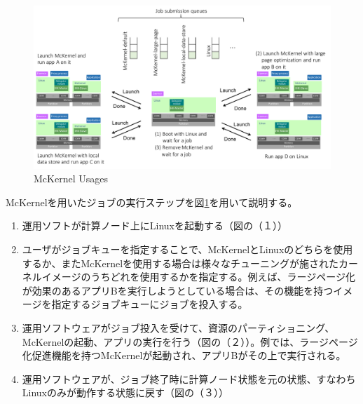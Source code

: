 \documentclass[twoside,11pt,fleqn]{book}
\begin{document}
\begin{figure}[hbt]
\begin{center}
\includegraphics[width=0.9\linewidth]{figs/McKernelUsage.pdf}
\end{center}
\caption{McKernel Usages}\label{fig:mckernel-usage}
\end{figure}
%
McKernelを用いたジョブの実行ステップを図\ref{fig:mckernel-usage}を用いて説明する。
\begin{enumerate}
\item 運用ソフトが計算ノード上にLinuxを起動する（図の（１））
\item ユーザがジョブキューを指定することで、McKernelとLinuxのどちらを使用するか、またMcKernelを使用する場合は様々なチューニングが施されたカーネルイメージのうちどれを使用するかを指定する。例えば、ラージページ化が効果のあるアプリBを実行しようとしている場合は、その機能を持つイメージを指定するジョブキューにジョブを投入する。
\item 運用ソフトウェアがジョブ投入を受けて、資源のパーティショニング、McKernelの起動、アプリの実行を行う（図の（２））。例では、ラージページ化促進機能を持つMcKernelが起動され、アプリBがその上で実行される。
\item 運用ソフトウェアが、ジョブ終了時に計算ノード状態を元の状態、すなわちLinuxのみが動作する状態に戻す（図の（３））
\end{enumerate}

\end{document}
